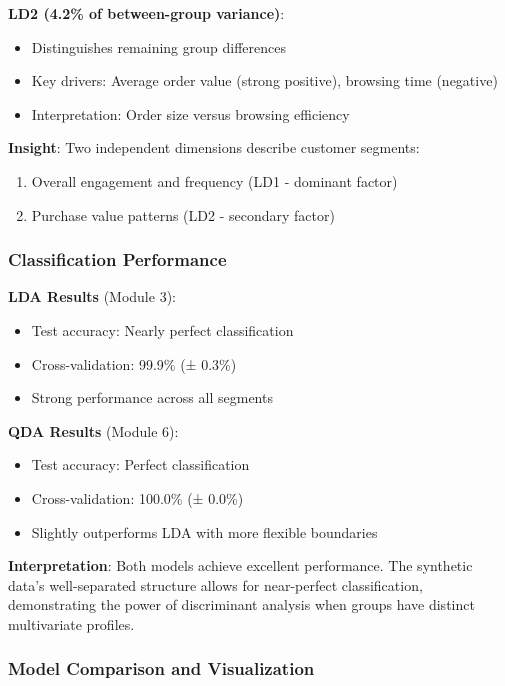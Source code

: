 \documentclass[
]{article}
\begin{document}
\textbf{LD2 (4.2\% of between-group variance)}:

\begin{itemize}
\item
  Distinguishes remaining group differences
\item
  Key drivers: Average order value (strong positive), browsing time
  (negative)
\item
  Interpretation: Order size versus browsing efficiency
\end{itemize}

\textbf{Insight}: Two independent dimensions describe customer segments:

\begin{enumerate}
\item
  Overall engagement and frequency (LD1 - dominant factor)
\item
  Purchase value patterns (LD2 - secondary factor)
\end{enumerate}

\subsubsection{Classification Performance}

\textbf{LDA Results} (Module 3):

\begin{itemize}
\item
  Test accuracy: Nearly perfect classification
\item
  Cross-validation: 99.9\% (± 0.3\%)
\item
  Strong performance across all segments
\end{itemize}

\textbf{QDA Results} (Module 6):

\begin{itemize}
\item
  Test accuracy: Perfect classification
\item
  Cross-validation: 100.0\% (± 0.0\%)
\item
  Slightly outperforms LDA with more flexible boundaries
\end{itemize}

\textbf{Interpretation}: Both models achieve excellent performance. The
synthetic data's well-separated structure allows for near-perfect
classification, demonstrating the power of discriminant analysis when
groups have distinct multivariate profiles.

\subsubsection{Model Comparison and Visualization}
\end{document}

